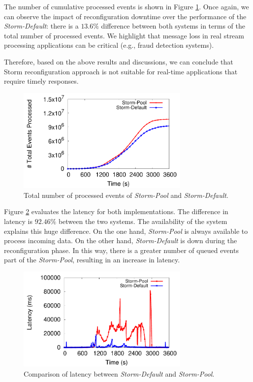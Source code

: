 The number of cumulative processed events is shown in Figure \ref{fig:exp-pool-exec-total}. Once again, we can observe the impact of reconfiguration downtime over the performance of the \textit{Storm-Default}: there is a $13.6\%$ difference between both systems in terms of the total number of processed events. We highlight  that message loss in real stream processing applications can be critical (e.g., fraud detection systems). 

Therefore, based on the above results and discussions, we can conclude that Storm reconfiguration approach is not suitable for real-time applications that require timely responses. 

\begin{figure}[!ht]
    \centering
    \includegraphics[width=0.75\textwidth]{figures/exp/storm/Pool-ExecutedTotal.pdf}
    \caption{Total number of processed events of \textit{Storm-Pool} and \textit{Storm-Default}.}
    \label{fig:exp-pool-exec-total}
\end{figure}

Figure \ref{fig:exp-pool-latency} evaluates the latency for both implementations. The difference in latency is $92.46\%$  between the two systems. The availability of the system explains this huge difference. On the one hand, \textit {Storm-Pool} is always available to process incoming data. On the other hand, \textit {Storm-Default} is down during the reconfiguration phase. 
In this way, there is a greater number of queued events part of the \textit {Storm-Pool}, resulting in an increase in latency.

\begin{figure}[!ht]
     \centering
     \includegraphics[width=0.75\textwidth]{figures/exp/storm/Pool-Latency.pdf}
     \caption{Comparison of latency between \textit{Storm-Default} and \textit{Storm-Pool}.}
     \label{fig:exp-pool-latency}
 \end{figure}

